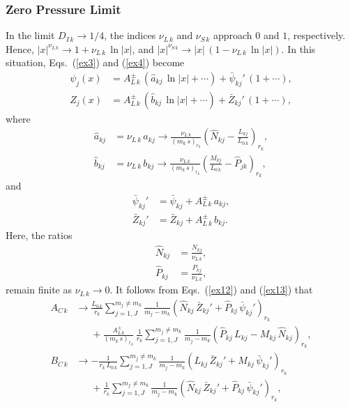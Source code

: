 \documentclass[12pt,prb,aps,notitlepage]{revtex4-1}
\begin{document}
\subsubsection{Zero Pressure Limit}
In the limit $D_{I\,k}\rightarrow 1/4$, the indices $\nu_{L\,k}$ and $\nu_{S\,k}$ approach $0$ and $1$, respectively. Hence, $|x|^{\nu_{L\,k}}\rightarrow 1+\nu_{L\,k}\,\ln |x|$, and $|x|^{\nu_{S\,k}}\rightarrow |x|\,(1-\nu_{L\,k}\,\ln |x|)$. In this situation, Eqs.~(\ref{ex3}) and (\ref{ex4})  become
\begin{align}\label{ex25}
\psi_j(x) &= A_{L\,k}^\pm\,(\hat{a}_{kj}\,\ln|x|+\cdots) + \bar{\psi}_{kj}'\,(1+\cdots),\\[0.5ex]
Z_j(x) &= A_{L\,k}^\pm\,(\hat{b}_{kj}\,\ln|x|+\cdots) + \bar{Z}_{kj}'\,(1+\cdots),\label{ex26}
\end{align}
where
\begin{align}
\hat{a}_{kj} &= \nu_{L\,k}\,a_{kj} \rightarrow \frac{\nu_{L\,k}}{(m_k\,s)_{r_k}}\left(\hat{N}_{kj}-\frac{L_{kj}}{L_{0\,k}}\right)_{r_k},\\[0.5ex]
\hat{b}_{kj} &= \nu_{L\,k}\,b_{kj} \rightarrow \frac{\nu_{L\,k}}{(m_k\,s)_{r_k}}\left(\frac{M_{kj}}{L_{0\,k}}-\hat{P}_{jk}\right)_{r_k},
\end{align}
and
\begin{align}
\bar{\psi}_{kj}' &= \bar{\psi}_{kj} + A_{L\,k}^\pm\,a_{kj},\\[0.5ex]
\bar{Z}_{kj}' &=  \bar{Z}_{kj} + A_{L\,k}^\pm\,b_{kj}.
\end{align}
Here, the ratios
\begin{align}
\hat{N}_{kj} &= \frac{N_{kj}}{\nu_{L\,k}},\\[0.5ex]
\hat{P}_{kj} &= \frac{P_{kj}}{\nu_{L\,k}},
\end{align}
remain finite as $\nu_{L\,k}\rightarrow 0$. 
It follows from Eqs.~(\ref{ex12}) and (\ref{ex13}) that
\begin{align}
A_{C\,k} &\rightarrow \frac{L_{0\,k}}{r_k}\sum_{j=1,J}^{m_j\neq m_k}
\frac{1}{m_j-m_k}\left(\hat{N}_{kj}\,\bar{Z}_{kj}' + \hat{P}_{kj}\,\bar{\psi}_{kj}'\right)_{r_k}\nonumber\\[0.5ex]
&\phantom{\rightarrow}+\frac{A_{L\,k}^\pm}{(m_k\,s)_{r_k}}\,\frac{1}{r_k}\sum_{j=1,J}^{m_j\neq m_k}
\frac{1}{m_j-m_k}\left(\hat{P}_{kj}\, L_{kj}- M_{kj}\,\hat{N}_{kj}\right)_{r_k},\\[0.5ex]
B_{C\,k} &\rightarrow- \frac{1}{r_k\,L_{0\,k}}\sum_{j=1,J}^{m_j\neq m_k}
\frac{1}{m_j-m_k}\left(L_{kj}\,\bar{Z}_{kj}' + M_{kj}\,\bar{\psi}_{kj}'\right)_{r_k}\nonumber\\[0.5ex]
&\phantom{\rightarrow}+\frac{1}{r_k}\sum_{j=1,J}^{m_j\neq m_k}
\frac{1}{m_j-m_k}\left(\hat{N}_{kj}\, \bar{Z}_{kj}'+ \hat{P}_{kj}\,\bar{\psi}_{kj}'\right)_{r_k},
\end{align}
\end{document}
